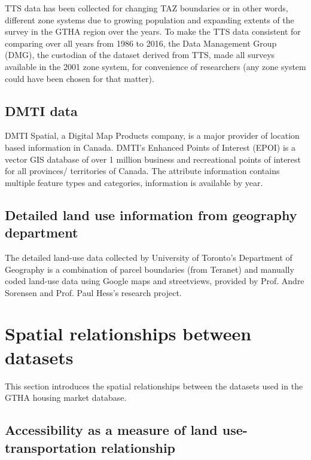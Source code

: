 TTS data has been collected for changing TAZ boundaries or in other words, different zone systems due to growing population and expanding extents of the survey in the GTHA region over the years.
To make the TTS data consistent for comparing over all years from 1986 to 2016, the Data Management Group (DMG), the custodian of the dataset derived from TTS, made all surveys available in the 2001 zone system, for convenience of researchers (any zone system could have been chosen for that matter).

\subsection{DMTI data} \label{subsec:dmti_data}

DMTI Spatial, a Digital Map Products company, is a major provider of location based information in Canada.
DMTI's Enhanced Points of Interest (EPOI) is a vector GIS database of over 1 million business and recreational points of interest for all provinces/ territories of Canada.
The attribute information contains multiple feature types and categories, information is available by year.

\subsection{Detailed land use information from geography department} \label{subsec:detailed_land_use_from_geogrpahy_department}

The detailed land-use data collected by University of Toronto's Department of Geography is a combination of parcel boundaries (from Teranet) and manually coded land-use data using Google maps and streetviews, provided by Prof.
Andre Sorensen and Prof.
Paul Hess's research project.

\section{Spatial relationships between datasets} \label{sec:spatial_relationships}

This section introduces the spatial relationships between the datasets used in the GTHA housing market database.

\subsection{Accessibility as a measure of land use-transportation relationship} \label{subsec:accessibility}


